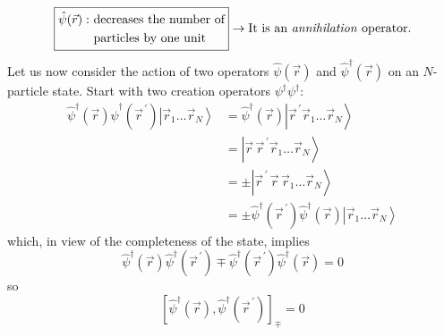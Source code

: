 \documentclass[12pt]{article}
\newcommand{\be}{\begin{equation}}
\newcommand{\ee}{\end{equation}}
\begin{document}
\[
\boxed{
\begin{aligned}
\hat{\psi}(\vec{r}):
&\text{ decreases the number of}\\
&\text{ particles by one unit}
\end{aligned}
}
\rightarrow \text{It is an \emph{annihilation} operator.}
\]
Let us now consider the action of two operators $\hat{\psi}(\vec{r})$ and 
$\hat{\psi}^{\dagger}(\vec{r})$ on an $N$-particle state. 
Start with two creation operators $\psi^\dagger\psi^\dagger$:
\be
\begin{aligned} 
\hat{\psi}^{\dagger}(\vec{r}) \hat{\psi}^{\dagger}(\vec{r}^{\,\prime})\left|\vec{r}_{1} \ldots \vec{r}_{N}\right\rangle 
&=\hat{\psi}^{\dagger}(\vec{r})\left|\vec{r}^{\,\prime} \vec{r}_{1} \ldots \vec{r}_{N}\right\rangle \\ 
&=\left|\vec{r}\,\vec{r}^{\,\prime} \vec{r}_{1} \ldots \vec{r}_{N}\right\rangle \\ 
&=\pm\left|\vec{r}^{\,\prime}\,\vec{r}\,\vec{r}_{1} \ldots \vec{r}_{N}\right\rangle \\ 
&=\pm \hat{\psi}^\dagger\left(\vec{r}^{\,\prime}\right) \hat{\psi}^\dagger(\vec{r})\left|\vec{r}_{1} \ldots \vec{r}_{N}\right\rangle 
\end{aligned}
\ee
which, in view of the completeness of the state, implies
\be
\hat{\psi}^{\dagger}(\vec{r}) \hat{\psi}^{\dagger}(\vec{r}^{\,\prime}) \mp \hat{\psi}^{\dagger}(\vec{r}^{\,\prime}) \hat{\psi}^{\dagger}(\vec{r}) = 0
\ee
so
\be
\left[\hat{\psi}^{\dagger}\left(\vec{r}\right), \hat{\psi}^{\dagger}\left(\vec{r}^{\,\prime}\right)\right]_{\mp}=0
\ee
\end{document}
